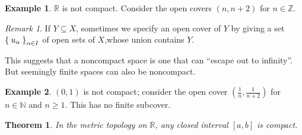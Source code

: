 \documentclass[12pt]{amsart}
\newcommand{\bbR}{\mathbb{R}}
\newcommand{\bbN}{\mathbb{N}}
\newcommand{\bbZ}{\mathbb{Z}}
\theoremstyle{plain}
\newtheorem*{thm}{Theorem}
\theoremstyle{remark}
\newtheorem*{rmk}{Remark}
\theoremstyle{definition}
\newtheorem*{eg}{Example}
\begin{document}
\begin{eg}
$\bbR$ is not compact. Consider the open covers $(n, n+2)$ for $n \in \bbZ$.
\end{eg}
\begin{rmk}
If $Y \subseteq X$, sometimes we specify an open cover of $Y$ by giving a set $\Set{u_{\alpha}}_{\alpha \in I}$ of open sets of $X$,whose union contains $Y$.
\end{rmk}

This suggests that a noncompact space is one that can ``escape out to infinity''. But seemingly finite spaces can also be noncompact. 

\begin{eg}
$(0,1)$ is not compact; consider the open cover $(\frac{1}{n}, \frac{1}{n+2})$ for $n \in \bbN$ and $n \geqslant 1$. This has no finite subcover.
\end{eg}

\newpage
\begin{thm}
In the metric topology on $\bbR$, any closed interval $[a, b]$ is compact.
\end{thm}
\end{document}
